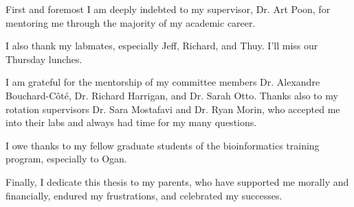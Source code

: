 First and foremost I am deeply indebted to my supervisor, Dr. Art Poon, 
for mentoring me through the majority of my academic career. 

I also thank my labmates, especially Jeff, Richard, and Thuy. I'll miss our
Thursday lunches.

I am grateful for the mentorship of my committee members Dr. Alexandre
Bouchard-C\^ot\'e, Dr. Richard Harrigan, and Dr. Sarah Otto. Thanks also to my
rotation supervisors Dr. Sara Mostafavi and Dr. Ryan Morin, who accepted me
into their labs and always had time for my many questions.

I owe thanks to my fellow graduate students of the bioinformatics training
program, especially to Ogan.

Finally, I dedicate this thesis to my parents, who have supported me morally
and financially, endured my frustrations, and celebrated my successes.
